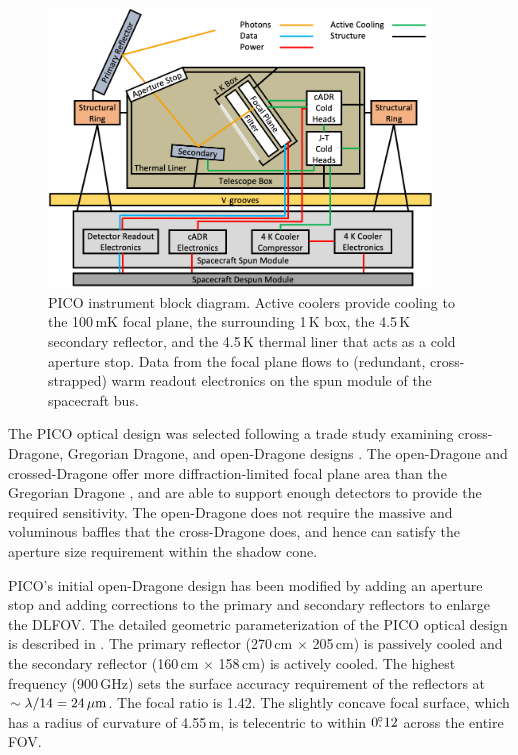 \begin{figure}%
\parbox{4.0in}{
\includegraphics[width=4.0in]{images/ArchitectureBlockDiagram.png} }
\hspace{0.1in}
\parbox{2.3in}{
\caption{\captiontext 
PICO instrument block diagram. Active coolers provide cooling
  to the 100\,mK focal plane, the surrounding 1\,K box, the 4.5\,K secondary reflector, and the
  4.5\,K thermal liner that acts as a cold aperture stop. Data from the focal
  plane flows to (redundant, cross-strapped) warm readout electronics
  on the spun module of the spacecraft
  bus.\label{fig:ArchitectureBlockDiagram} }  }
\end{figure}

The PICO optical design was selected following a trade study examining
cross-Dragone, Gregorian Dragone, and open-Dragone designs
\citep{Young2018}.  The open-Dragone and crossed-Dragone offer more
diffraction-limited focal plane area than the Gregorian Dragone
\citep{deBernardis2018}, and are able to support enough detectors to
provide the required sensitivity. The open-Dragone does not require
the massive and voluminous baffles that the cross-Dragone does, and
hence can satisfy the aperture size requirement within the shadow
cone.

PICO's initial open-Dragone design has been modified by adding an
aperture stop and adding corrections to the primary and secondary
reflectors to enlarge the DLFOV. The detailed geometric
parameterization of the PICO optical design is described in
\cite{Young2018}. The primary reflector (270\,cm $\times$ 205\,cm) is
passively cooled and the secondary reflector (160\,cm $\times$
158\,cm) is actively cooled. The highest frequency (900\,GHz) sets the
surface accuracy requirement of the reflectors at
$\sim \lambda/14 =24\,\mu{\rm m}$. The focal ratio is 1.42. The
slightly concave focal surface, which has a radius of curvature of
4.55\,m, is telecentric to within $0.\!\!^\circ12$ across the entire FOV.

